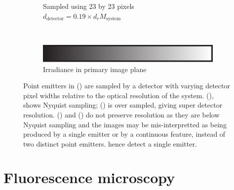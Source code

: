\begin{figure}
\begin{subfigure}[t]{0.4\textwidth}
        \caption{Sampled using 23 by 23 pixels\\\(d_{\text{detector}} = 0.19 \times d_{r}M_{\text{system}}\)}
        \label{fig:digital_airy_sample_23}
    \end{subfigure}
    \\
    \begin{subfigure}[t]{\textwidth}
      \vspace{\abovecaptionskip}
      \centering
      \includegraphics{./sampling/colourbar}\\
      Irradiance in primary image plane
    \end{subfigure}
    \caption{Point emitters in () are sampled by a detector with varying detector pixel widths relative to the optical resolution of the system.
    (), shows Nyquist sampling;
    () is over sampled, giving super detector resolution.
    () and () do not preserve resolution as they are below Nyquist sampling and the images may be mis-interpretted as being produced by a single emitter or by a continuous feature, instead of two distinct point emitters.
    hence detect a single emitter.}
    \label{fig:airy_disk_resolution}
\end{figure}
\pagebreak

%


\section{Fluorescence microscopy}
